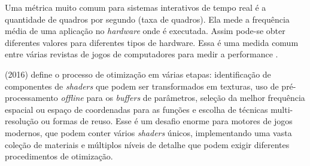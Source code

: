 Uma métrica muito comum para sistemas interativos de tempo real é a quantidade de quadros por segundo (taxa de quadros). Ela mede a frequência média de uma aplicação no \textit{hardware} onde é executada. Assim pode-se obter diferentes valores para diferentes tipos de hardware. Essa é uma medida comum entre várias revistas de jogos de computadores para medir a performance \cite{rehfeld2014profile}.

 (2016) define o processo de otimização em várias etapas: identificação de componentes de \textit{shaders} que podem ser transformados em texturas, uso de pré-processamento \textit{offline} para os \textit{buffers} de parâmetros, seleção da melhor frequência espacial ou espaço de coordenadas para as funções e escolha de técnicas multi-resolução ou formas de reuso. Esse é um desafio enorme para motores de jogos modernos, que podem conter vários \textit{shaders} únicos, implementando uma vasta coleção de materiais e múltiplos níveis de detalhe que podem exigir diferentes procedimentos de otimização.
